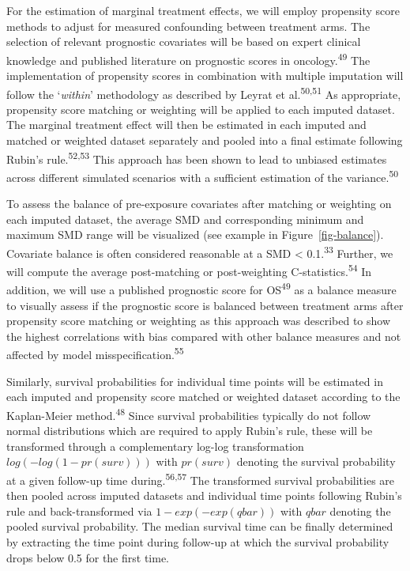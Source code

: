 \documentclass[
  letterpaper,
  DIV=11,
  numbers=noendperiod]{scrartcl}
\begin{document}
For the estimation of marginal treatment effects, we will employ
propensity score methods to adjust for measured confounding between
treatment arms. The selection of relevant prognostic covariates will be
based on expert clinical knowledge and published literature on
prognostic scores in oncology.\textsuperscript{49} The implementation of
propensity scores in combination with multiple imputation will follow
the `\emph{within}' methodology as described by Leyrat et
al.\textsuperscript{50,51} As appropriate, propensity score matching or
weighting will be applied to each imputed dataset. The marginal
treatment effect will then be estimated in each imputed and matched or
weighted dataset separately and pooled into a final estimate following
Rubin's rule.\textsuperscript{52,53} This approach has been shown to
lead to unbiased estimates across different simulated scenarios with a
sufficient estimation of the variance.\textsuperscript{50}

To assess the balance of pre-exposure covariates after matching or
weighting on each imputed dataset, the average SMD and corresponding
minimum and maximum SMD range will be visualized (see example in
Figure~\ref{fig-balance}). Covariate balance is often considered
reasonable at a SMD \textless{} 0.1.\textsuperscript{33} Further, we
will compute the average post-matching or post-weighting
C-statistics.\textsuperscript{54} In addition, we will use a published
prognostic score for OS\textsuperscript{49} as a balance measure to
visually assess if the prognostic score is balanced between treatment
arms after propensity score matching or weighting as this approach was
described to show the highest correlations with bias compared with other
balance measures and not affected by model
misspecification.\textsuperscript{55}

Similarly, survival probabilities for individual time points will be
estimated in each imputed and propensity score matched or weighted
dataset according to the Kaplan-Meier method.\textsuperscript{48} Since
survival probabilities typically do not follow normal distributions
which are required to apply Rubin's rule, these will be transformed
through a complementary log-log transformation \(log(-log(1-pr(surv)))\)
with \(pr(surv)\) denoting the survival probability at a given follow-up
time during.\textsuperscript{56,57} The transformed survival
probabilities are then pooled across imputed datasets and individual
time points following Rubin's rule and back-transformed via
\(1-exp(-exp(qbar))\) with \(qbar\) denoting the pooled survival
probability. The median survival time can be finally determined by
extracting the time point during follow-up at which the survival
probability drops below 0.5 for the first time.
\end{document}
